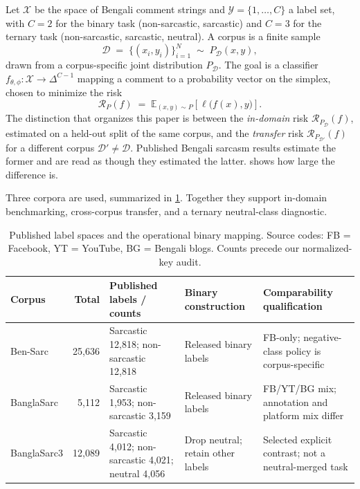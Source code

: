 \documentclass{ieeeaccess}
\newcommand{\dset}[1]{#1}
\begin{document}
Let $\mathcal{X}$ be the space of Bengali comment strings and $\mathcal{Y}=\{1,\dots,C\}$ a label set, with $C\!=\!2$ for the binary task (non-sarcastic, sarcastic) and $C\!=\!3$ for the ternary task (non-sarcastic, sarcastic, neutral). A corpus is a finite sample
\begin{equation}
\mathcal{D} \;=\; \{(x_i,y_i)\}_{i=1}^{N} \;\sim\; P_{\mathcal{D}}(x,y),
\label{eq:corpus}
\end{equation}
drawn from a corpus-specific joint distribution $P_{\mathcal{D}}$. The goal is a classifier $f_{\theta,\phi}:\mathcal{X}\to\Delta^{C-1}$ mapping a comment to a probability vector on the simplex, chosen to minimize the risk
\begin{equation}
\mathcal{R}_{P}(f) \;=\; \mathbb{E}_{(x,y)\sim P}\!\left[\ell\big(f(x),y\big)\right].
\label{eq:risk}
\end{equation}
The distinction that organizes this paper is between the \emph{in-domain} risk $\mathcal{R}_{P_{\mathcal{D}}}(f)$, estimated on a held-out split of the same corpus, and the \emph{transfer} risk $\mathcal{R}_{P_{\mathcal{D}'}}(f)$ for a different corpus $\mathcal{D}'\!\neq\!\mathcal{D}$. Published Bengali sarcasm results estimate the former and are read as though they estimated the latter.  shows how large the difference is.

Three corpora are used, summarized in \cref{tab:datasets-overview}. Together they support in-domain benchmarking, cross-corpus transfer, and a ternary neutral-class diagnostic.

\begin{table}[!t]
\centering
\caption{Published label spaces and the operational binary mapping. Source codes: FB = Facebook, YT = YouTube, BG = Bengali blogs. Counts precede our normalized-key audit.}
\label{tab:datasets-overview}
\footnotesize
\begin{tabularx}{\textwidth}{@{}lrXlX@{}}
\toprule
\textbf{Corpus} & \textbf{Total} & \textbf{Published labels / counts} & \textbf{Binary construction} & \textbf{Comparability qualification} \\
\midrule
\dset{Ben-Sarc} & 25{,}636 & Sarcastic 12{,}818; non-sarcastic 12{,}818 & Released binary labels & FB-only; negative-class policy is corpus-specific \\
\dset{BanglaSarc} & 5{,}112 & Sarcastic 1{,}953; non-sarcastic 3{,}159 & Released binary labels & FB/YT/BG mix; annotation and platform mix differ \\
\dset{BanglaSarc3} & 12{,}089 & Sarcastic 4{,}012; non-sarcastic 4{,}021; neutral 4{,}056 & Drop neutral; retain other labels & Selected explicit contrast; not a neutral-merged task \\
\bottomrule
\end{tabularx}
\end{table}
\end{document}
